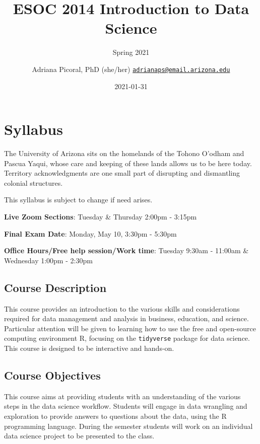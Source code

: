 \documentclass[
]{book}
\title{ESOC 2014 Introduction to Data Science}
\subtitle{Spring 2021}
\author{Adriana Picoral, PhD (she/her) \href{mailto:adrianaps@email.arizona.edu}{\nolinkurl{adrianaps@email.arizona.edu}}}
\date{2021-01-31}
\begin{document}
\maketitle

{
\setcounter{tocdepth}{1}
\tableofcontents
}
\hypertarget{syllabus}{%
\chapter{Syllabus}\label{syllabus}}

The University of Arizona sits on the homelands of the Tohono O'odham and Pascua Yaqui, whose care and keeping of these lands allows us to be here today. Territory acknowledgments are one small part of disrupting and dismantling colonial structures.

This syllabus is subject to change if need arises.

\textbf{Live Zoom Sections}: Tuesday \& Thursday 2:00pm - 3:15pm

\textbf{Final Exam Date}: Monday, May 10, 3:30pm - 5:30pm

\textbf{Office Hours/Free help session/Work time}: Tuesday 9:30am - 11:00am \& Wednesday 1:00pm - 2:30pm

\hypertarget{course-description}{%
\section{Course Description}\label{course-description}}

This course provides an introduction to the various skills and considerations required for data management and analysis in business, education, and science. Particular attention will be given to learning how to use the free and open-source computing environment R, focusing on the \texttt{tidyverse} package for data science. This course is designed to be interactive and hands-on.

\hypertarget{course-objectives}{%
\section{Course Objectives}\label{course-objectives}}

This course aims at providing students with an understanding of the various steps in the data science workflow. Students will engage in data wrangling and exploration to provide answers to questions about the data, using the R programming language. During the semester students will work on an individual data science project to be presented to the class.
\end{document}
